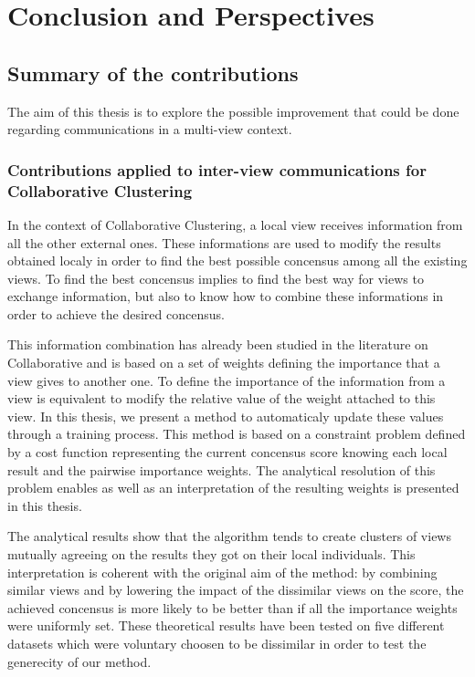 \chapter{Conclusion and Perspectives}

\minitoc{}
\newpage

\section{Summary of the contributions}
The aim of this thesis is to explore the possible improvement that could be done regarding communications in a multi-view context.

\subsection{Contributions applied to inter-view communications for Collaborative Clustering}

In the context of Collaborative Clustering, a local view receives information from all the other external ones. These informations are used to modify the results obtained localy in order to find the best possible concensus among all the existing views. To find the best concensus implies to find the best way for views to exchange information, but also to know how to combine these informations in order to achieve the desired concensus.

This information combination has already been studied in the literature on Collaborative and is based on a set of weights defining the importance that a view gives to another one. To define the importance of the information from a view is equivalent to modify the relative value of the weight attached to this view. In this thesis, we present a method to automaticaly update these values through a training process. This method is based on a constraint problem defined by a cost function representing the current concensus score knowing each local result and the pairwise importance weights. The analytical resolution of this problem enables as well as an interpretation of the resulting weights is presented in this thesis.

The analytical results show that the algorithm tends to create clusters of views mutually agreeing on the results they got on their local individuals. This interpretation is coherent with the original aim of the method: by combining similar views and by lowering the impact of the dissimilar views on the score, the achieved concensus is more likely to be better than if all the importance weights were uniformly set. These theoretical results have been tested on five different datasets which were voluntary choosen to be dissimilar in order to test the generecity of our method.

